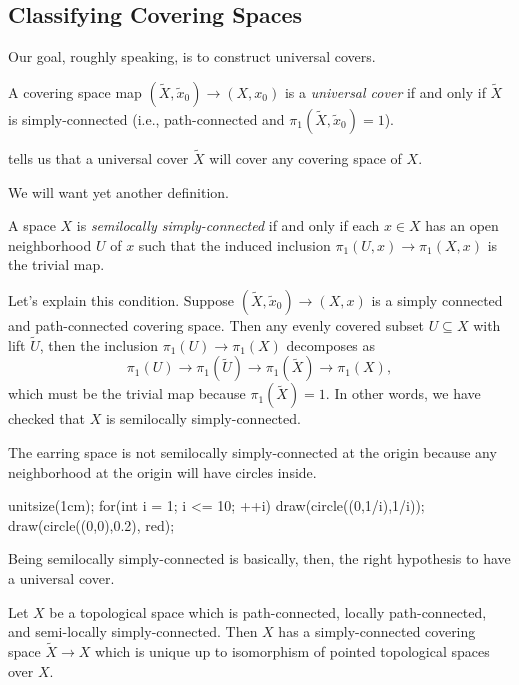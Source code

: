 \documentclass[../notes.tex]{subfiles}
\begin{document}
\subsection{Classifying Covering Spaces}
Our goal, roughly speaking, is to construct universal covers.
\begin{definition}
	A covering space map $(\widetilde X,\widetilde x_0)\to(X,x_0)$ is a \textit{universal cover} if and only if $\widetilde X$ is simply-connected (i.e., path-connected and $\pi_1(\widetilde X,\widetilde x_0)=1$).
\end{definition}
\begin{remark}
	 tells us that a universal cover $\widetilde X$ will cover any covering space of $X$.
\end{remark}
We will want yet another definition.
\begin{definition}
	A space $X$ is \textit{semilocally simply-connected} if and only if each $x\in X$ has an open neighborhood $U$ of $x$ such that the induced inclusion $\pi_1(U,x)\to\pi_1(X,x)$ is the trivial map.
\end{definition}
\begin{remark}
	Let's explain this condition. Suppose $(\widetilde X,\widetilde x_0)\to(X,x)$ is a simply connected and path-connected covering space. Then any evenly covered subset $U\subseteq X$ with lift $\widetilde U$, then the inclusion $\pi_1(U)\to\pi_1(X)$ decomposes as
	\[\pi_1(U)\to\pi_1(\widetilde U)\to\pi_1(\widetilde X)\to\pi_1(X),\]
	which must be the trivial map because $\pi_1(\widetilde X)=1$. In other words, we have checked that $X$ is semilocally simply-connected.
\end{remark}
\begin{example}
	The earring space is not semilocally simply-connected at the origin because any neighborhood at the origin will have circles inside.
	\begin{center}
		\begin{asy}
			unitsize(1cm);
			for(int i = 1; i <= 10; ++i)
			{
				draw(circle((0,1/i),1/i));
			}
			draw(circle((0,0),0.2), red);
		\end{asy}
	\end{center}
\end{example}
Being semilocally simply-connected is basically, then, the right hypothesis to have a universal cover.
\begin{theorem} \label{thm:univ-covering-space}
	Let $X$ be a topological space which is path-connected, locally path-connected, and semi-locally simply-connected. Then $X$ has a simply-connected covering space $\widetilde X\to X$ which is unique up to isomorphism of pointed topological spaces over $X$.
\end{theorem}
\end{document}
